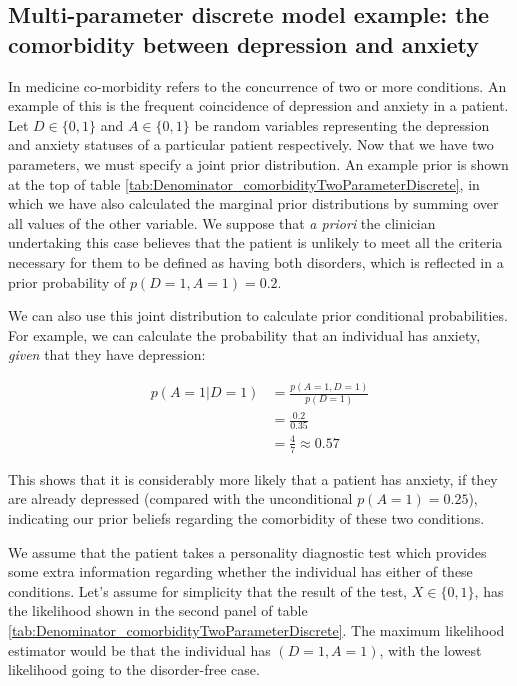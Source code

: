 \documentclass[11pt,fullpage]{book}
\begin{document}
\subsection{Multi-parameter discrete model example: the comorbidity between depression and anxiety}\label{sec:Denominator_comorbidityTwoParameterDiscrete}
In medicine co-morbidity refers to the concurrence of two or more conditions. An example of this is the frequent coincidence of depression and anxiety in a patient. Let $D\in\{0,1\}$ and $A\in\{0,1\}$ be random variables representing the depression and anxiety statuses of a particular patient respectively. Now that we have two parameters, we must specify a joint prior distribution. An example prior is shown at the top of table \ref{tab:Denominator_comorbidityTwoParameterDiscrete}, in which we have also calculated the marginal prior distributions by summing over all values of the other variable. We suppose that \textit{a priori} the clinician undertaking this case believes that the patient is unlikely to meet all the criteria necessary for them to be defined as having both disorders, which is reflected in a prior probability of $p(D=1,A=1)=0.2$.

We can also use this joint distribution to calculate prior conditional probabilities. For example, we can calculate the probability that an individual has anxiety, \textit{given} that they have depression:

\begin{align}
p(A=1|D=1) &= \frac{p(A=1,D=1)}{p(D=1)}\\
&= \frac{0.2}{0.35}\\
&=\frac{4}{7}\approx 0.57
\end{align}

This shows that it is considerably more likely that a patient has anxiety, if they are already depressed (compared with the unconditional $p(A=1)=0.25$), indicating our prior beliefs regarding the comorbidity of these two conditions.

We assume that the patient takes a personality diagnostic test which provides some extra information regarding whether the individual has either of these conditions. Let's assume for simplicity that the result of the test, $X\in\{0,1\}$, has the likelihood shown in the second panel of table \ref{tab:Denominator_comorbidityTwoParameterDiscrete}. The maximum likelihood estimator would be that the individual has $(D=1,A=1)$, with the lowest likelihood going to the disorder-free case.
\end{document}
